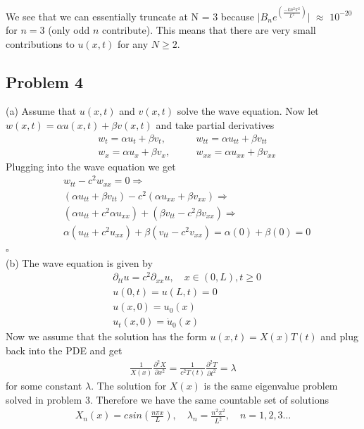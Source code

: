 \documentclass[10pt]{article}
\begin{document}
\noindent We see that we can essentially truncate at N = 3 because $\vert B_ne^(\frac{-kn^2\pi^2}{L^2}) \vert$ $\approx$ $10^{-20}$ for $n = 3$ (only odd $n$ contribute). This means that there are very small contributions to $u(x,t)$ for any $N \geq 2$. 

\newpage

\subsection*{Problem 4}
(a) Assume that $u(x,t)$ and $v(x,t)$ solve the wave equation. Now let $w(x,t) = \alpha u(x,t) + \beta v(x,t)$ and take partial derivatives
\begin{align*}
& w_t = \alpha u_t + \beta v_t, \quad && w_{tt} = \alpha u_{tt} + \beta v_{tt} \\
& w_x = \alpha u_x + \beta v_x, \quad && w_{xx} = \alpha u_{xx} + \beta v_{xx}
\end{align*}
Plugging into the wave equation we get
\begin{align*}
& w_{tt} - c^2w_{xx} = 0 \Rightarrow \\
& (\alpha u_{tt} + \beta v_{tt}) - c^2(\alpha u_{xx} + \beta v_{xx}) \Rightarrow \\
& (\alpha u_{tt}  + c^2\alpha u_{xx}) + (\beta v_{tt} -c^2\beta v_{xx}) \Rightarrow \\
& \alpha(u_{tt}  + c^2 u_{xx}) + \beta(v_{tt} -c^2 v_{xx}) = \alpha(0) + \beta(0) = 0 
\end{align*}
\hfill $\square$ \\
(b) The wave equation is given by
\begin{align*}
& \partial_{tt}u = c^2\partial_{xx}u, \quad x \in (0,L), t \geq 0 \\
& u(0,t) = u(L,t) = 0 \\
& u(x,0) = u_0(x) \\
& u_t(x,0) = \dot{u}_0(x)
\end{align*}
Now we assume that the solution has the form $u(x,t) = X(x)T(t)$ and plug back into the PDE and get
\begin{align*}
\frac{1}{X(x)}\frac{\partial^2X}{\partial x^2} = \frac{1}{c^2T(t)}\frac{\partial^2T}{\partial t^2} = \lambda
\end{align*}
for some constant $\lambda$. The solution for $X(x)$ is the same eigenvalue problem solved in problem 3. Therefore we have the same countable set of solutions
\begin{align*}
X_n(x) = csin(\frac{n \pi x}{L}), \quad \lambda_n = \frac{n^2\pi^2}{L^2}, \quad n = 1,2,3\ldots
\end{align*}
\end{document}
